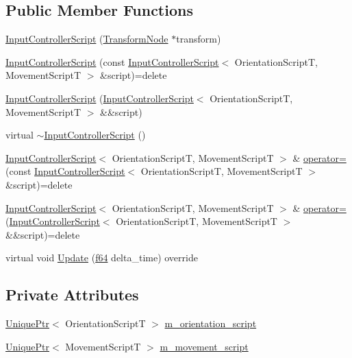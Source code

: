 \subsection*{Public Member Functions}
\begin{DoxyCompactItemize}
\item 
\hyperlink{classmage_1_1_input_controller_script_adf1edb71170cb5184f201a64ad7455cb}{Input\+Controller\+Script} (\hyperlink{structmage_1_1_transform_node}{Transform\+Node} $\ast$transform)
\item 
\hyperlink{classmage_1_1_input_controller_script_a22de786b39180e18b8565b211797388d}{Input\+Controller\+Script} (const \hyperlink{classmage_1_1_input_controller_script}{Input\+Controller\+Script}$<$ Orientation\+ScriptT, Movement\+ScriptT $>$ \&script)=delete
\item 
\hyperlink{classmage_1_1_input_controller_script_a18b905c7a204c22173dcaf19a9587f7d}{Input\+Controller\+Script} (\hyperlink{classmage_1_1_input_controller_script}{Input\+Controller\+Script}$<$ Orientation\+ScriptT, Movement\+ScriptT $>$ \&\&script)
\item 
virtual \hyperlink{classmage_1_1_input_controller_script_ac5699d9a4d9a3f9c456885a92dede979}{$\sim$\+Input\+Controller\+Script} ()
\item 
\hyperlink{classmage_1_1_input_controller_script}{Input\+Controller\+Script}$<$ Orientation\+ScriptT, Movement\+ScriptT $>$ \& \hyperlink{classmage_1_1_input_controller_script_a747a0a1cb4064a5b8580195c0a53b887}{operator=} (const \hyperlink{classmage_1_1_input_controller_script}{Input\+Controller\+Script}$<$ Orientation\+ScriptT, Movement\+ScriptT $>$ \&script)=delete
\item 
\hyperlink{classmage_1_1_input_controller_script}{Input\+Controller\+Script}$<$ Orientation\+ScriptT, Movement\+ScriptT $>$ \& \hyperlink{classmage_1_1_input_controller_script_a2e2231433ec17577ce019348285eaba3}{operator=} (\hyperlink{classmage_1_1_input_controller_script}{Input\+Controller\+Script}$<$ Orientation\+ScriptT, Movement\+ScriptT $>$ \&\&script)=delete
\item 
virtual void \hyperlink{classmage_1_1_input_controller_script_ac522d6cffc26418c514de396f80fa56c}{Update} (\hyperlink{namespacemage_ab935747c6941320bd6214b5a5f265b09}{f64} delta\+\_\+time) override
\end{DoxyCompactItemize}
\subsection*{Private Attributes}
\begin{DoxyCompactItemize}
\item 
\hyperlink{namespacemage_a3316d7143a973e37adf1110f2e80ca31}{Unique\+Ptr}$<$ Orientation\+ScriptT $>$ \hyperlink{classmage_1_1_input_controller_script_ab5af05a3bf7cdd672382dd5bcb1d6d02}{m\+\_\+orientation\+\_\+script}
\item 
\hyperlink{namespacemage_a3316d7143a973e37adf1110f2e80ca31}{Unique\+Ptr}$<$ Movement\+ScriptT $>$ \hyperlink{classmage_1_1_input_controller_script_aea0478602dbabf616dd3ef8b4408a42a}{m\+\_\+movement\+\_\+script}
\end{DoxyCompactItemize}
